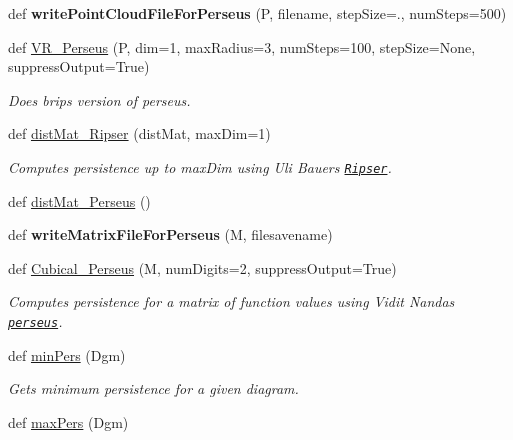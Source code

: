 \begin{DoxyCompactItemize}
def {\bfseries write\+Point\+Cloud\+File\+For\+Perseus} (P, filename, step\+Size=., num\+Steps=500)
\item 
def \hyperlink{namespaceteaspoon_1_1_t_d_a_1_1_persistence_ae3954f45636c5f88b8e7cb7b422eea3d}{V\+R\+\_\+\+Perseus} (P, dim=1, max\+Radius=3, num\+Steps=100, step\+Size=None, suppress\+Output=True)
\begin{DoxyCompactList}\small\item\em Does brips version of perseus. \end{DoxyCompactList}\item 
def \hyperlink{namespaceteaspoon_1_1_t_d_a_1_1_persistence_a5d253547a9b956b8d5169808f31b42d2}{dist\+Mat\+\_\+\+Ripser} (dist\+Mat, max\+Dim=1)
\begin{DoxyCompactList}\small\item\em Computes persistence up to max\+Dim using Uli Bauer\textquotesingle{}s \href{https://github.com/Ripser/ripser}{\tt Ripser}. \end{DoxyCompactList}\item 
def \hyperlink{namespaceteaspoon_1_1_t_d_a_1_1_persistence_a0660fcd00ca57001f21bfaaefb1da9c3}{dist\+Mat\+\_\+\+Perseus} ()
\item 
\mbox{\label{namespaceteaspoon_1_1_t_d_a_1_1_persistence_a7ee47776929d1ade75b059415918a328}} 
def {\bfseries write\+Matrix\+File\+For\+Perseus} (M, filesavename)
\item 
def \hyperlink{namespaceteaspoon_1_1_t_d_a_1_1_persistence_aa583aa9a694aeaa3983e77319ac68e84}{Cubical\+\_\+\+Perseus} (M, num\+Digits=2, suppress\+Output=True)
\begin{DoxyCompactList}\small\item\em Computes persistence for a matrix of function values using Vidit Nanda\textquotesingle{}s \href{http://people.maths.ox.ac.uk/nanda/perseus/index.html}{\tt perseus}. \end{DoxyCompactList}\item 
def \hyperlink{namespaceteaspoon_1_1_t_d_a_1_1_persistence_aadc062063e1ed3050361dba5c7d47a0f}{min\+Pers} (Dgm)
\begin{DoxyCompactList}\small\item\em Gets minimum persistence for a given diagram. \end{DoxyCompactList}\item 
def \hyperlink{namespaceteaspoon_1_1_t_d_a_1_1_persistence_aff5b752e3141736e91e1386d28b3dfd5}{max\+Pers} (Dgm)

\end{DoxyCompactItemize}
